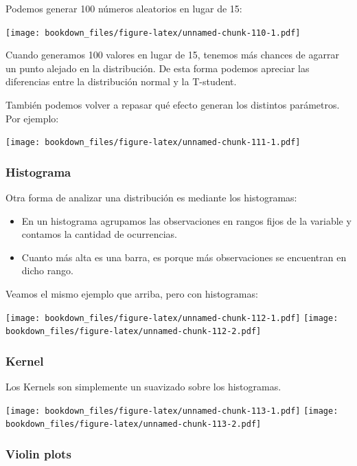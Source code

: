 \documentclass[]{book}
\providecommand{\tightlist}{%
  \setlength{\itemsep}{0pt}\setlength{\parskip}{0pt}}
\begin{document}
Podemos generar 100 números aleatorios en lugar de 15:

\texttt{[image: bookdown\_files/figure-latex/unnamed-chunk-110-1.pdf]}

Cuando generamos 100 valores en lugar de 15, tenemos más chances de agarrar un punto alejado en la distribución. De esta forma podemos apreciar las diferencias entre la distribución normal y la T-student.

También podemos volver a repasar qué efecto generan los distintos parámetros. Por ejemplo:

\texttt{[image: bookdown\_files/figure-latex/unnamed-chunk-111-1.pdf]}

\hypertarget{histograma}{%
\subsubsection{Histograma}\label{histograma}}

Otra forma de analizar una distribución es mediante los histogramas:

\begin{itemize}
\tightlist
\item
  En un histograma agrupamos las observaciones en rangos fijos de la variable y contamos la cantidad de ocurrencias.
\item
  Cuanto más alta es una barra, es porque más observaciones se encuentran en dicho rango.
\end{itemize}

Veamos el mismo ejemplo que arriba, pero con histogramas:

\texttt{[image: bookdown\_files/figure-latex/unnamed-chunk-112-1.pdf]} \texttt{[image: bookdown\_files/figure-latex/unnamed-chunk-112-2.pdf]}

\hypertarget{kernel}{%
\subsubsection{Kernel}\label{kernel}}

Los Kernels son simplemente un suavizado sobre los histogramas.

\texttt{[image: bookdown\_files/figure-latex/unnamed-chunk-113-1.pdf]} \texttt{[image: bookdown\_files/figure-latex/unnamed-chunk-113-2.pdf]}

\hypertarget{violin-plots}{%
\subsubsection{Violin plots}\label{violin-plots}}
\end{document}
